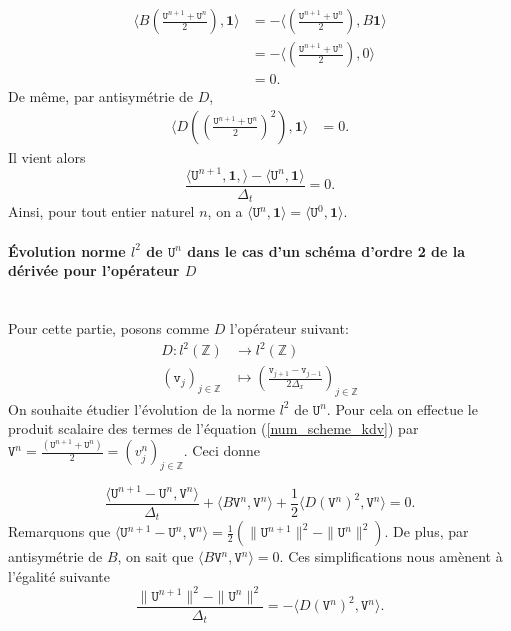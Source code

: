 \documentclass[12pt,a4paper]{article}
\numberwithin{equation}{section}
\begin{document}
\begin{equation*}
    \begin{split}
        \langle B\left(\frac{\texttt{U}^{n+1} + \texttt{U}^{n}}{2}\right),\textbf{1}\rangle  &= -\langle \left(\frac{\texttt{U}^{n+1} + \texttt{U}^{n}}{2}\right),B\textbf{1}\rangle \\
        &= -\langle \left(\frac{\texttt{U}^{n+1} + \texttt{U}^{n}}{2}\right),0\rangle \\
        &= 0.
    \end{split}
\end{equation*}
De même, par antisymétrie de $D$, 
\begin{equation*}
    \begin{split}
        \langle D\left( \left(\frac{\texttt{U}^{n+1} + \texttt{U}^{n}}{2}\right)^2 \right),\textbf{1}\rangle &= 0.
    \end{split}
\end{equation*}
Il vient alors 
\begin{equation*}
    \frac{\langle \texttt{U}^{n+1},\textbf{1},\rangle -\langle \texttt{U}^n,\textbf{1}\rangle }{\Delta_t} = 0 .
\end{equation*}
Ainsi, pour tout entier naturel $n$, on a $\langle \texttt{U}^n,\textbf{1}\rangle  = \langle \texttt{U}^0,\textbf{1}\rangle $.

\paragraph{Évolution norme $l^2$ de $\texttt{U}^n$ dans le cas d'un schéma d'ordre 2 de la dérivée pour l'opérateur $D$}\,\\

Pour cette partie, posons comme $D$ l'opérateur suivant:
\begin{align*}
        D : l^2(\mathbb{Z}) &\longrightarrow l^2(\mathbb{Z})\\
        (\texttt{v}_j)_{j\in\mathbb{Z}} &\mapsto \left(\frac{\texttt{v}_{j+1} - \texttt{v}_{j-1} }{2\Delta_x}\right)_{j\in\mathbb{Z}}
\end{align*}
On souhaite étudier l'évolution de la norme $l^2$ de $\texttt{U}^n$.  Pour cela on effectue le produit scalaire des termes de l'équation (\ref{num_scheme_kdv}) par $ \texttt{V}^n = \frac{(\texttt{U}^{n+1} + \texttt{U}^{n})}{2} = (v^n_j)_{j\in\mathbb{Z}}$. Ceci donne

\begin{equation*}
    \frac{\langle \texttt{U}^{n+1} - \texttt{U}^n,\texttt{V}^n\rangle }{\Delta_t} + \langle B\texttt{V}^n,\texttt{V}^n\rangle  + \frac{1}{2}\langle D (\texttt{V}^n)^2 ,\texttt{V}^n\rangle  = 0 .
\end{equation*}
Remarquons que $\langle \texttt{U}^{n+1} - \texttt{U}^n,\texttt{V}^n\rangle  = \frac{1}{2}\left(\|\texttt{U}^{n+1}\|^2-\|\texttt{U}^{n}\|^2\right)$. De plus, par antisymétrie de $B$, on sait que $\langle B\texttt{V}^n,\texttt{V}^n\rangle  = 0$. Ces simplifications nous amènent à l'égalité suivante
\begin{equation*}
    \frac{\|\texttt{U}^{n+1}\|^2-\|\texttt{U}^{n}\|^2}{\Delta_t} = -\langle D (\texttt{V}^n)^2 ,\texttt{V}^n\rangle  .
\end{equation*}
\end{document}

